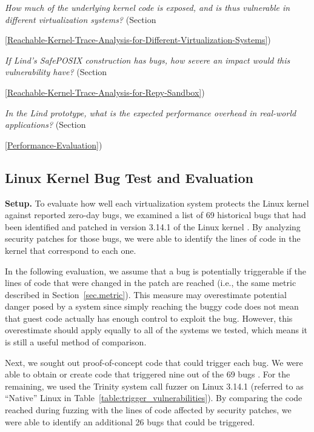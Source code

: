 \textit{How much of the underlying kernel code is exposed, and is thus
vulnerable in different virtualization systems?}
(Section~{{\ref{Reachable-Kernel-Trace-Analysis-for-Different-Virtualization-Systems}})

\textit{If Lind's SafePOSIX construction has bugs, how severe an impact would
this vulnerability have?}
(Section~{{\ref{Reachable-Kernel-Trace-Analysis-for-Repy-Sandbox}})

\textit{In the Lind prototype, what is the expected performance overhead in
real-world applications?}
(Section~{{\ref{Performance-Evaluation}})

\subsection{Linux Kernel Bug Test and Evaluation}
\label{Linux-Kernel-Bug-Test-and-Evaluation}


\noindent
\textbf{Setup.}
To evaluate how well each virtualization system protects the Linux kernel
against reported zero-day bugs,
we examined a list of 69 historical bugs that had been identified and patched in version 3.14.1 of the Linux kernel \cite{CVE-Datasource}.
By analyzing security patches for those bugs,
we were able to identify the lines of code in the kernel that correspond to each one.

In the following evaluation, we assume that a bug is potentially triggerable if the lines of code that were changed in the patch are reached
(i.e., the same metric described in Section~\ref{sec.metric}).
This measure may overestimate potential danger posed by a system since simply reaching the buggy code does not mean that guest code
actually has enough control to exploit the bug.
However, this overestimate should apply equally to all of the systems we tested, which means it is still a useful method of comparison.

Next, we sought out proof-of-concept code that could trigger each bug.
We were able to obtain or create code that triggered nine out of the 69 bugs \cite{Exploit-Database}.
For the remaining, we used the Trinity system call fuzzer
\cite{Trinity} on Linux 3.14.1 (referred to as ``Native'' Linux in Table~\ref{table:trigger_vulnerabilities}).
By comparing the code reached during fuzzing with the lines of code affected by security patches,
we were able to identify an additional 26 bugs that could be triggered.

}}}
